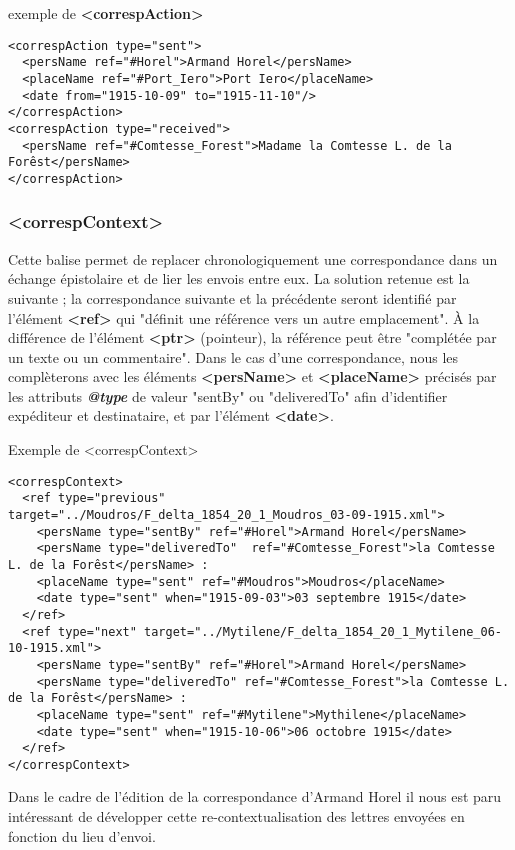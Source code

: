 \documentclass[18pt,a4paper,oneside]{book} %
\begin{document}
exemple de \textbf{<correspAction>}
\begin{lstlisting}
<correspAction type="sent">
  <persName ref="#Horel">Armand Horel</persName>
  <placeName ref="#Port_Iero">Port Iero</placeName>
  <date from="1915-10-09" to="1915-11-10"/>
</correspAction>
<correspAction type="received">
  <persName ref="#Comtesse_Forest">Madame la Comtesse L. de la Forêst</persName>                  
</correspAction>
\end{lstlisting}

\subsubsection{<correspContext>}

Cette balise permet de replacer chronologiquement une correspondance dans un échange épistolaire et de lier les envois entre eux.
La solution retenue est la suivante ; la correspondance suivante et la précédente seront identifié par l'élément \textbf{<ref>} qui "définit une référence vers un autre emplacement". À la différence de l'élément \textbf{<ptr>} (pointeur), la référence peut être "complétée par un texte ou un commentaire". Dans le cas d'une correspondance, nous les complèterons avec les éléments \textbf{<persName>} et \textbf{<placeName>} précisés par les attributs \textbf{\textit{@type}} de valeur "sentBy" ou "deliveredTo" afin d'identifier expéditeur et destinataire, et par l'élément \textbf{<date>}.
\bigskip 

Exemple de <correspContext>
\begin{lstlisting}
<correspContext>
  <ref type="previous" target="../Moudros/F_delta_1854_20_1_Moudros_03-09-1915.xml"> 
    <persName type="sentBy" ref="#Horel">Armand Horel</persName> 
    <persName type="deliveredTo"  ref="#Comtesse_Forest">la Comtesse L. de la Forêst</persName> :
    <placeName type="sent" ref="#Moudros">Moudros</placeName> 
    <date type="sent" when="1915-09-03">03 septembre 1915</date>
  </ref>
  <ref type="next" target="../Mytilene/F_delta_1854_20_1_Mytilene_06-10-1915.xml">
    <persName type="sentBy" ref="#Horel">Armand Horel</persName> 
    <persName type="deliveredTo" ref="#Comtesse_Forest">la Comtesse L. de la Forêst</persName> : 
    <placeName type="sent" ref="#Mytilene">Mythilene</placeName> 
    <date type="sent" when="1915-10-06">06 octobre 1915</date>
  </ref>
</correspContext>
\end{lstlisting}

Dans le cadre de l'édition de la correspondance d'Armand Horel il nous est paru intéressant de développer cette re-contextualisation des lettres envoyées en fonction du lieu d'envoi.
\end{document}
